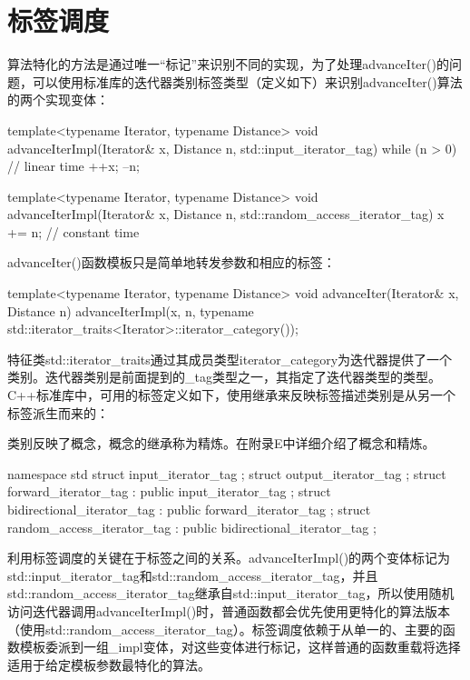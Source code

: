 \section{标签调度}

算法特化的方法是通过唯一“标记”来识别不同的实现，为了处理advanceIter()的问题，可以使用标准库的迭代器类别标签类型（定义如下）来识别advanceIter()算法的两个实现变体：

\begin{cpp}
template<typename Iterator, typename Distance>
void advanceIterImpl(Iterator& x, Distance n, std::input_iterator_tag) {
	while (n > 0) { // linear time
		++x;
		--n;
	}
}

template<typename Iterator, typename Distance>
void advanceIterImpl(Iterator& x, Distance n,
					std::random_access_iterator_tag) {
	x += n; // constant time
}
\end{cpp}

advanceIter()函数模板只是简单地转发参数和相应的标签：

\begin{cpp}
template<typename Iterator, typename Distance>
void advanceIter(Iterator& x, Distance n) {
	advanceIterImpl(x, n,
				typename
						std::iterator_traits<Iterator>::iterator_category());
}
\end{cpp}

特征类std::iterator\_traits通过其成员类型iterator\_category为迭代器提供了一个类别。迭代器类别是前面提到的\_tag类型之一，其指定了迭代器类型的类型。C++标准库中，可用的标签定义如下，使用继承来反映标签描述类别是从另一个标签派生而来的：

\begin{notice}
类别反映了概念，概念的继承称为精炼。在附录E中详细介绍了概念和精炼。
\end{notice}

\begin{cpp}
namespace std {
	struct input_iterator_tag { };
	struct output_iterator_tag { };
	struct forward_iterator_tag : public input_iterator_tag { };
	struct bidirectional_iterator_tag : public forward_iterator_tag { };
	struct random_access_iterator_tag : public bidirectional_iterator_tag { };
}
\end{cpp}

利用标签调度的关键在于标签之间的关系。advanceIterImpl()的两个变体标记为std::input\_iterator\_tag和std::random\_access\_iterator\_tag，并且std::random\_access\_iterator\_tag继承自std::input\_iterator\_tag，所以使用随机访问迭代器调用advanceIterImpl()时，普通函数都会优先使用更特化的算法版本（使用std::random\_access\_iterator\_tag）。标签调度依赖于从单一的、主要的函数模板委派到一组\_impl变体，对这些变体进行标记，这样普通的函数重载将选择适用于给定模板参数最特化的算法。

